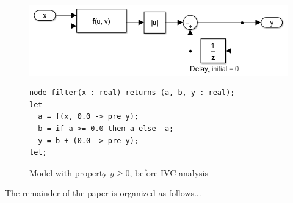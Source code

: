\begin{figure}[t]
\centering
\includegraphics[width=\columnwidth]{figs/simulink.png}
{\smaller
\begin{verbatim}
node filter(x : real) returns (a, b, y : real);
let
  a = f(x, 0.0 -> pre y);
  b = if a >= 0.0 then a else -a;
  y = b + (0.0 -> pre y);
tel;
\end{verbatim}
}
\vspace{-0.1in}
\caption{Model with property $y \geq 0$, before IVC analysis}
\label{fig:ex-before}
\end{figure}

The remainder of the paper is organized as follows...
